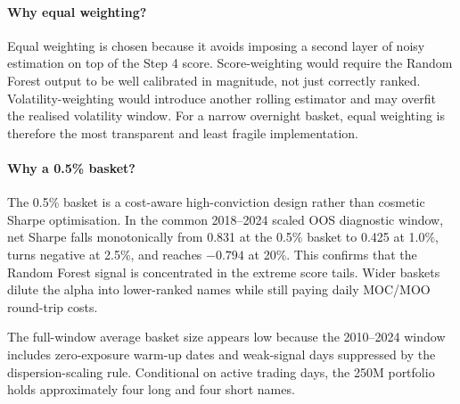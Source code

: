 \documentclass[12pt,a4paper]{article}
\begin{document}
\paragraph{Why equal weighting?}
Equal weighting is chosen because it avoids imposing a second layer of noisy
estimation on top of the Step 4 score. Score-weighting would require the Random
Forest output to be well calibrated in magnitude, not just correctly ranked.
Volatility-weighting would introduce another rolling estimator and may overfit
the realised volatility window. For a narrow overnight basket, equal weighting is
therefore the most transparent and least fragile implementation.

\paragraph{Why a 0.5\% basket?}
The 0.5\% basket is a cost-aware high-conviction design rather than cosmetic
Sharpe optimisation. In the common 2018--2024 scaled OOS diagnostic window, net
Sharpe falls monotonically from 0.831 at the 0.5\% basket to 0.425 at 1.0\%,
turns negative at 2.5\%, and reaches $-0.794$ at 20\%. This confirms that the
Random Forest signal is concentrated in the extreme score tails. Wider baskets
dilute the alpha into lower-ranked names while still paying daily MOC/MOO
round-trip costs.

The full-window average basket size appears low because the 2010--2024 window
includes zero-exposure warm-up dates and weak-signal days suppressed by the
dispersion-scaling rule. Conditional on active trading days, the 250M portfolio
holds approximately four long and four short names.
\end{document}
